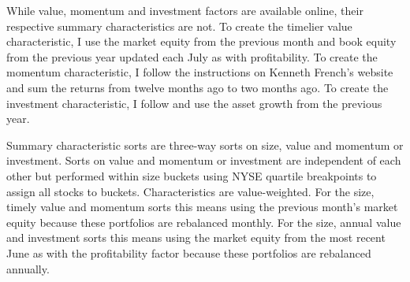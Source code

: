 While value, momentum and investment factors are available online, their
respective summary characteristics are not. To create the timelier value
characteristic, I use the market equity from the previous month and book equity
from the previous year updated each July as with profitability. To create the
momentum characteristic, I follow the instructions on Kenneth French’s website
and sum the returns from twelve months ago to two months ago. To create the
investment characteristic, I follow \textcite{fama2015five} and use the asset
growth from the previous year.

Summary characteristic sorts are three-way sorts on size, value and momentum or
investment. Sorts on value and momentum or investment are independent of each
other but performed within size buckets using NYSE quartile breakpoints to
assign all stocks to buckets. Characteristics are value-weighted. For the size,
timely value and momentum sorts this means using the previous month’s market
equity because these portfolios are rebalanced monthly. For the size, annual
value and investment sorts this means using the market equity from the most
recent June as with the profitability factor because these portfolios are
rebalanced annually.
